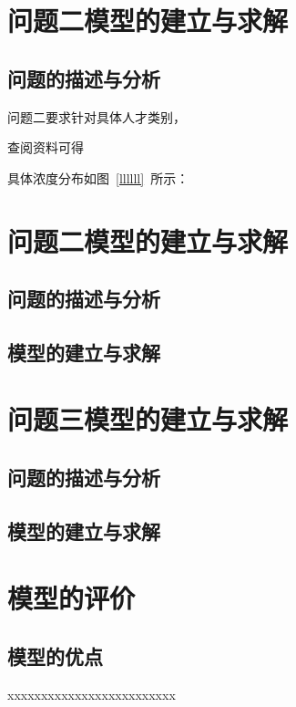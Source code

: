 \documentclass{whutmod}
\begin{document}
	\section{问题二模型的建立与求解}
	\subsection{问题的描述与分析}
	问题二要求针对具体人才类别，


	查阅资料可得\parencite{宋鸿2010城市人才吸引力的影响因素及提升对策}
	
具体浓度分布如图~\ref{llllll}~所示：


	\section{问题二模型的建立与求解}
	\subsection{问题的描述与分析}
	\subsection{模型的建立与求解}
	

	\section{问题三模型的建立与求解}
	
	
	\subsection{问题的描述与分析}

	\subsection{模型的建立与求解}


	\section{模型的评价}
	\subsection{模型的优点}
xxxxxxxxxxxxxxxxxxxxxxxxx
	
\end{document}
